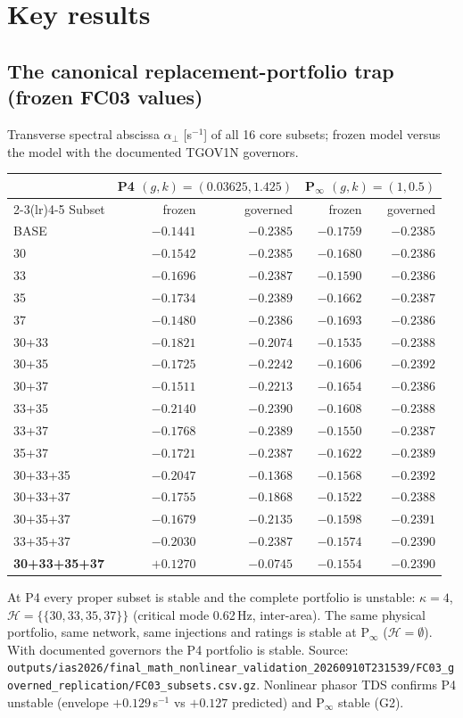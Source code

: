 \documentclass[10pt,a4paper]{article}
\theoremstyle{definition}
\newcommand{\Hy}{\mathcal{H}}
\newcommand{\aperp}{\alpha_\perp}
\begin{document}
\section{Key results}\label{sec:results}

\subsection{The canonical replacement-portfolio trap (frozen FC03 values)}
Transverse spectral abscissa $\aperp$ [s$^{-1}$] of all 16 core subsets; frozen model versus the
model with the documented TGOV1N governors.
\begin{center}\small
\begin{tabular}{@{}lrrrr@{}}
\toprule
& \multicolumn{2}{c}{P4 $(g,k)=(0.03625,1.425)$} & \multicolumn{2}{c}{P$_\infty$ $(g,k)=(1,0.5)$}\\
\cmidrule(lr){2-3}\cmidrule(lr){4-5}
Subset & frozen & governed & frozen & governed\\
\midrule
BASE & $-0.1441$ & $-0.2385$ & $-0.1759$ & $-0.2385$\\
30 & $-0.1542$ & $-0.2385$ & $-0.1680$ & $-0.2386$\\
33 & $-0.1696$ & $-0.2387$ & $-0.1590$ & $-0.2386$\\
35 & $-0.1734$ & $-0.2389$ & $-0.1662$ & $-0.2387$\\
37 & $-0.1480$ & $-0.2386$ & $-0.1693$ & $-0.2386$\\
30+33 & $-0.1821$ & $-0.2074$ & $-0.1535$ & $-0.2388$\\
30+35 & $-0.1725$ & $-0.2242$ & $-0.1606$ & $-0.2392$\\
30+37 & $-0.1511$ & $-0.2213$ & $-0.1654$ & $-0.2386$\\
33+35 & $-0.2140$ & $-0.2390$ & $-0.1608$ & $-0.2388$\\
33+37 & $-0.1768$ & $-0.2389$ & $-0.1550$ & $-0.2387$\\
35+37 & $-0.1721$ & $-0.2387$ & $-0.1622$ & $-0.2389$\\
30+33+35 & $-0.2047$ & $-0.1368$ & $-0.1568$ & $-0.2392$\\
30+33+37 & $-0.1755$ & $-0.1868$ & $-0.1522$ & $-0.2388$\\
30+35+37 & $-0.1679$ & $-0.2135$ & $-0.1598$ & $-0.2391$\\
33+35+37 & $-0.2030$ & $-0.2387$ & $-0.1574$ & $-0.2390$\\
\textbf{30+33+35+37} & $\mathbf{+0.1270}$ & $-0.0745$ & $-0.1554$ & $-0.2390$\\
\bottomrule
\end{tabular}
\end{center}
At P4 every proper subset is stable and the complete portfolio is unstable: $\kappa=4$,
$\Hy=\{\{30,33,35,37\}\}$ (critical mode 0.62\,Hz, inter-area). The same physical portfolio, same
network, same injections and ratings is stable at P$_\infty$ ($\Hy=\emptyset$). With documented governors
the P4 portfolio is stable. Source: \nolinkurl{outputs/ias2026/final_math_nonlinear_validation_20260910T231539/FC03_governed_replication/FC03_subsets.csv.gz}.
Nonlinear phasor TDS confirms P4 unstable (envelope $+0.129$\,s$^{-1}$ vs $+0.127$ predicted) and P$_\infty$
stable (G2).
\end{document}
